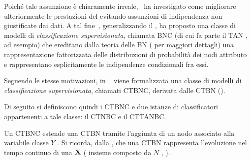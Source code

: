 Poiché tale assunzione è chiaramente irreale,~\citet{Friedman1997} ha investigato come migliorare ulteriormente le prestazioni del \lwcase \nb{} \class{} evitando assunzioni di indipendenza non giustificate dai dati. A tal fine~\citet{Friedman1997}, generalizzando il \lwcase \nb{} \class{}, ha proposto una classe di modelli di \emph{classificazione supervisionata}, chiamata \acf{BNC} (di cui fa parte il \acf{TAN} \class{}, ad esempio) che ereditano dalla teoria delle \acl{BN} ( per maggiori dettagli) una rappresentazione fattorizzata delle distribuzioni di probabilità dei nodi attributo e rappresentano esplicitamente le indipendenze condizionali fra essi.

Seguendo le stesse motivazioni, in ~\citet{Stella2012} viene formalizzata una classe di modelli di \emph{classificazione supervisionata}, chiamati \acf{CTBNC}, derivata dalle \acs{CTBN} ().

Di seguito si definiscono quindi i \acl{CTBNC} e due istanze di classificatori appartenenti a tale classe: il \acf{CTNBC} e il \acf{CTTANBC}.

Un \acl{CTBNC} estende una \acs{CTBN} tramite l'aggiunta di un nodo associato alla variabile classe $\mathnormal{Y}$. Si ricorda, dalla , che una \acs{CTBN} rappresenta l'evoluzione nel tempo continuo di una \pv{} $\mathbf{X}$ (\ie{} insieme composto da $N$ \mprocess{}, ).

